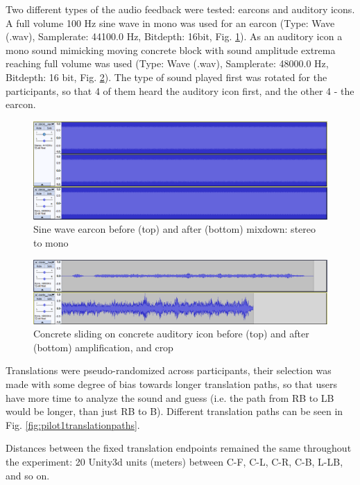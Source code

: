 Two different types of the audio feedback were tested: earcons and auditory icons. A full volume 100 Hz sine wave in mono was used for an earcon (Type: Wave (.wav), Samplerate: 44100.0 Hz, Bitdepth: 16bit, Fig. \ref{fig:pilot1sinewaveedit}). As an auditory icon a mono sound mimicking moving concrete block with sound amplitude extrema reaching full volume was used (Type: Wave (.wav), Samplerate: 48000.0 Hz, Bitdepth: 16 bit, Fig. \ref{fig:pilot1concreteonconcretesoundedit}).
The type of sound played first was rotated for the participants, so that 4 of them heard the auditory icon first, and the other 4 - the earcon.

\begin{figure}
	\centering
	\includegraphics[width=0.7\linewidth]{figures/pilot1_sinewave_edit}
	\caption{Sine wave earcon before (top) and after (bottom) mixdown: stereo to mono}
	\label{fig:pilot1sinewaveedit}
\end{figure}

\begin{figure}
	\centering
	\includegraphics[width=0.7\linewidth]{figures/pilot1_concrete_on_concrete_sound_edit}
	\caption{Concrete sliding on concrete auditory icon before (top) and after (bottom) amplification, and crop}
	\label{fig:pilot1concreteonconcretesoundedit}
\end{figure}

Translations were pseudo-randomized across participants, their selection was made with some degree of bias towards longer translation paths, so that users have more time to analyze the sound and guess (i.e. the path from RB to LB would be longer, than just RB to B). Different translation paths can be seen in Fig. \ref{fig:pilot1translationpaths}.

Distances between the fixed translation endpoints remained the same throughout the experiment: 20 Unity3d units (meters) between C-F, C-L, C-R, C-B, L-LB, and so on.

